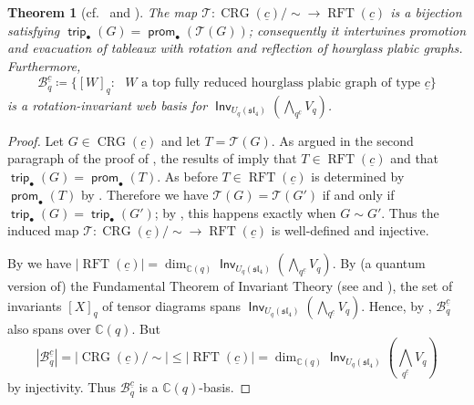 \documentclass{amsart}
\newtheorem{theorem}{Theorem}[section]
\theoremstyle{definition}
\theoremstyle{remark}
\numberwithin{equation}{section}
\DeclareMathOperator{\trip}{\mathsf{trip}}
\DeclareMathOperator{\rft}{RFT}
\DeclareMathOperator{\prom}{\mathsf{prom}}
\newcommand{\fsl}{\mathfrak{sl}}
\DeclareMathOperator{\Inv}{\mathsf{Inv}}
\DeclareMathOperator{\crg}{CRG}
\begin{document}
\begin{theorem}[cf.\  and ]
\label{thm:basis-without-growth-rules}
    The map $\mathcal{T}:\crg(\underline{c})/{\sim} \to \rft(\underline{c})$ is a bijection satisfying $\trip_{\bullet}(G)=\prom_{\bullet}(\mathcal{T}(G))$; consequently it intertwines promotion and evacuation of tableaux with rotation and reflection of hourglass plabic graphs. Furthermore, 
    \[   \mathscr{B}_q^{\underline{c}} \coloneqq \{[W]_q : \text{ $W$ a top fully reduced hourglass plabic graph of type $\underline{c}$}\}
\]
is a rotation-invariant web basis for $\Inv_{U_q(\fsl_4)}(\bigwedge_q\nolimits^{\underline{c}} V_q)$. 
\end{theorem}
\begin{proof}
    Let $G \in \crg(\underline{c})$ and let $T=\mathcal{T}(G)$. As argued in the second paragraph of the proof of , the results of  imply that $T \in \rft(\underline{c})$ and that $\trip_{\bullet}(G)=\prom_{\bullet}(T)$. As before $T \in \rft(\underline{c})$ is determined by $\prom_{\bullet}(T)$ by \cite[Thm.~6.12]{fluctuating-paper}. Therefore we have $\mathcal{T}(G)=\mathcal{T}(G')$ if and only if $\trip_{\bullet}(G)=\trip_{\bullet}(G')$; by , this happens exactly when $G \sim G'$. Thus the induced map $\mathcal{T}:\crg(\underline{c})/{\sim} \to \rft(\underline{c})$ is well-defined and injective.

    By  we have $|\rft(\underline{c})|=\dim_{\mathbb{C}(q)} \Inv_{U_q(\fsl_4)}(\bigwedge_q\nolimits^{\underline{c}} V_q)$. By (a quantum version of) the Fundamental Theorem of Invariant Theory (see \cite{Cautis-Kamnitzer-Morrison} and \cite{Weyl}), the set of invariants $[X]_q$ of tensor diagrams spans $\Inv_{U_q(\fsl_4)}(\bigwedge_q\nolimits^{\underline{c}} V_q)$. Hence, by , $\mathscr{B}_q^{\underline{c}}$ also spans over $\mathbb{C}(q)$. But \[
    |\mathscr{B}_q^{\underline{c}}|=|\crg(\underline{c})/{\sim}| \leq |\rft(\underline{c})|=\dim_{\mathbb{C}(q)} \Inv_{U_q(\fsl_4)}(\bigwedge_q\nolimits^{\underline{c}} V_q)\]
    by injectivity. Thus $\mathscr{B}_q^{\underline{c}}$ is a $\mathbb{C}(q)$-basis.
\end{proof}
\end{document}
